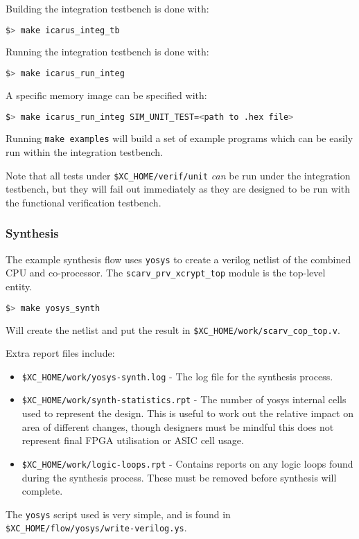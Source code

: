 Building the integration testbench is done with:
\begin{lstlisting}[language=bash]  
$> make icarus_integ_tb
\end{lstlisting}

Running the integration testbench is done with:

\begin{lstlisting}[language=bash]
$> make icarus_run_integ
\end{lstlisting}

A specific memory image can be specified with:

\begin{lstlisting}[language=bash]
$> make icarus_run_integ SIM_UNIT_TEST=<path to .hex file>
\end{lstlisting}

Running {\tt make examples} will build a set of example programs which can
be easily run within the integration testbench.

Note that all tests under {\tt \$XC\_HOME/verif/unit} {\em can} be run
under the integration testbench, but they will fail out immediately
as they are designed to be run with the functional verification testbench.

\subsubsection{Synthesis}

The example synthesis flow uses {\tt yosys} to create a verilog netlist of
the combined CPU and co-processor.
The {\tt scarv\_prv\_xcrypt\_top} module is the top-level entity.

\begin{lstlisting}[language=bash]
$> make yosys_synth
\end{lstlisting}

\noindent
Will create the netlist and put the result in 
{\tt \$XC\_HOME/work/scarv\_cop\_top.v}.

\noindent
Extra report files include:
\begin{itemize}
\item {\tt \$XC\_HOME/work/yosys-synth.log} - 
    The log file for the synthesis process.
\item {\tt \$XC\_HOME/work/synth-statistics.rpt} - 
    The number of yosys internal cells used to represent the design.
    This is useful to work out the relative impact on area of different
    changes, though designers must be mindful this does not represent
    final FPGA utilisation or ASIC cell usage.
\item {\tt \$XC\_HOME/work/logic-loops.rpt} - 
    Contains reports on any logic loops found during the synthesis process.
    These must be removed before synthesis will complete.
\end{itemize}

\noindent
The {\tt yosys} script used is very simple, and is found in
{\tt \$XC\_HOME/flow/yosys/write-verilog.ys}.
